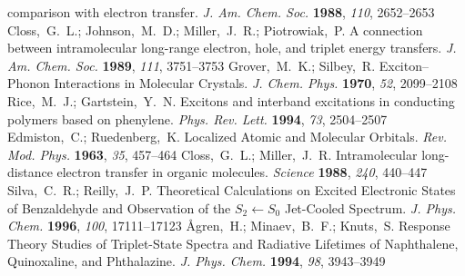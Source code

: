 \begin{mcitethebibliography}{27}
  comparison with electron transfer. \emph{J.  Am.  Chem.  Soc.} \textbf{1988}, \emph{110}, 2652--2653\relax
\mciteBstWouldAddEndPuncttrue
\mciteSetBstMidEndSepPunct{\mcitedefaultmidpunct}
{\mcitedefaultendpunct}{\mcitedefaultseppunct}\relax
\EndOfBibitem
{}
Closs,~G.~L.; Johnson,~M.~D.; Miller,~J.~R.; Piotrowiak,~P. A connection
  between intramolecular long-range electron, hole, and triplet energy
  transfers. \emph{J.  Am.  Chem.  Soc.} \textbf{1989},
  \emph{111}, 3751--3753\relax
\mciteBstWouldAddEndPuncttrue
\mciteSetBstMidEndSepPunct{\mcitedefaultmidpunct}
{\mcitedefaultendpunct}{\mcitedefaultseppunct}\relax
\EndOfBibitem
{}
Grover,~M.~K.; Silbey,~R. Exciton--Phonon Interactions in Molecular Crystals.
  \emph{J. Chem. Phys.} \textbf{1970}, \emph{52},
  2099--2108\relax
\mciteBstWouldAddEndPuncttrue
\mciteSetBstMidEndSepPunct{\mcitedefaultmidpunct}
{\mcitedefaultendpunct}{\mcitedefaultseppunct}\relax
\EndOfBibitem
{}
Rice,~M.~J.; Gartstein,~Y.~N. Excitons and interband excitations in conducting
  polymers based on phenylene. \emph{Phys. Rev. Lett.} \textbf{1994},
  \emph{73}, 2504--2507\relax
\mciteBstWouldAddEndPuncttrue
\mciteSetBstMidEndSepPunct{\mcitedefaultmidpunct}
{\mcitedefaultendpunct}{\mcitedefaultseppunct}\relax
\EndOfBibitem
{}
Edmiston,~C.; Ruedenberg,~K. Localized Atomic and Molecular Orbitals.
  \emph{Rev. Mod. Phys.} \textbf{1963}, \emph{35}, 457--464\relax
\mciteBstWouldAddEndPuncttrue
\mciteSetBstMidEndSepPunct{\mcitedefaultmidpunct}
{\mcitedefaultendpunct}{\mcitedefaultseppunct}\relax
\EndOfBibitem
{}
Closs,~G.~L.; Miller,~J.~R. Intramolecular long-distance electron transfer in
  organic molecules. \emph{Science} \textbf{1988}, \emph{240}, 440--447\relax
\mciteBstWouldAddEndPuncttrue
\mciteSetBstMidEndSepPunct{\mcitedefaultmidpunct}
{\mcitedefaultendpunct}{\mcitedefaultseppunct}\relax
\EndOfBibitem
{}
Silva,~C.~R.; Reilly,~J.~P. Theoretical Calculations on Excited Electronic
  States of Benzaldehyde and Observation of the $S_2\leftarrow S_0$ Jet-Cooled
  Spectrum. \emph{J. Phys. Chem.} \textbf{1996}, \emph{100},
  17111--17123\relax
\mciteBstWouldAddEndPuncttrue
\mciteSetBstMidEndSepPunct{\mcitedefaultmidpunct}
{\mcitedefaultendpunct}{\mcitedefaultseppunct}\relax
\EndOfBibitem
{}
{\AA}gren,~H.; Minaev,~B.~F.; Knuts,~S. Response Theory Studies of
  Triplet-State Spectra and Radiative Lifetimes of Naphthalene, Quinoxaline,
  and Phthalazine. \emph{J.  Phys.  Chem.} \textbf{1994},
  \emph{98}, 3943--3949\relax
\mciteBstWouldAddEndPuncttrue
\mciteSetBstMidEndSepPunct{\mcitedefaultmidpunct}
{\mcitedefaultendpunct}{\mcitedefaultseppunct}\relax
\EndOfBibitem

\end{mcitethebibliography}

